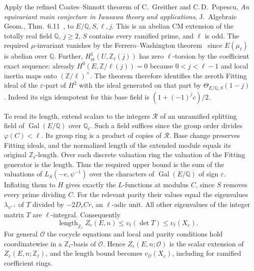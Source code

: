 Apply the refined Coates--Sinnott theorem of C.~Greither and
C.\,D.~Popescu, \emph{An equivariant main conjecture in Iwasawa
theory and applications}, J.~Algebraic Geom., Thm.~6.11~\cite{gp}, to
$E/\mathbb Q,S,\ell,j$. This is an abelian CM extension of the
totally real field $\mathbb Q$, $j\ge2$, $S$ contains every ramified
prime, and $\ell$ is odd. The required $\mu$-invariant vanishes by
the Ferrero--Washington theorem~\cite{fw} since $E(\mu_\ell)$ is abelian over
$\mathbb Q$. Further, $H^1_{\mathrm{\acute et}}(U,\mathbb Z_\ell(j))$
has zero $\ell$-torsion by the coefficient exact sequence: already
$H^0(E,\mathbb Z/\ell(j))=0$ because $0<j<\ell-1$ and local inertia
maps onto $(\mathbb Z/\ell)^\times$. The theorem therefore identifies
the zeroth Fitting ideal of the $\varepsilon$-part of $H^2$ with the
ideal generated on that part by $\Theta_{E/\mathbb Q,S}(1-j)$.
Indeed its sign idempotent for this base field is
$(1+(-1)^jc)/2$.

To read its length, extend scalars to the integers $\mathcal R$ of
an unramified splitting field of $\operatorname{Gal}(E/\mathbb Q)$
over $\mathbb Q_\ell$. Such a field suffices since the group order
divides $\varphi(C)<\ell$. Its group ring is a product of copies of
$\mathcal R$. Base change preserves Fitting ideals, and the normalized
length of the extended module equals its original $\mathbb Z_\ell$-length.
Over each discrete valuation ring the valuation of the Fitting
generator is the length. Thus the required upper bound is the sum of
the valuations of $L_S(-e,\psi^{-1})$ over the characters of
$\operatorname{Gal}(E/\mathbb Q)$ of sign $\varepsilon$. Inflating
them to $H$ gives exactly the $L$-functions at modulus $C$, since
$S$ removes every prime dividing $C$. For the relevant parity their
values equal the eigenvalues $\lambda_{\psi^{-1}}$ of $T$ divided by
$-2D_r C r$, an $\ell$-adic unit. All other eigenvalues of the
integer matrix $T$ are $\ell$-integral. Consequently
\[
 \operatorname{length}_{\mathbb Z_\ell}Z_e(E,n)
 \le v_\ell(\det T)\le v_\ell(X_e).
\]
For general $\mathcal O$ the cocycle equations and local and parity
conditions hold coordinatewise in a $\mathbb Z_\ell$-basis of
$\mathcal O$. Hence $Z_e(E,n;\mathcal O)$ is the scalar extension
of $Z_e(E,n;\mathbb Z_\ell)$, and the length bound becomes
$v_{\mathcal O}(X_e)$, including for ramified coefficient rings.

